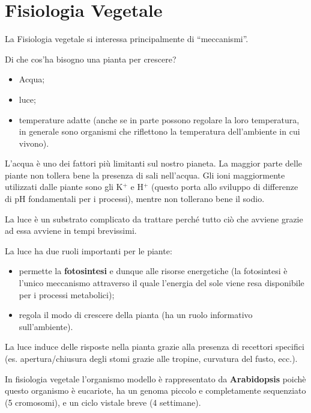 \documentclass[]{article}
\begin{document}
\section{Fisiologia Vegetale}\label{fisiologia-vegetale}

La Fisiologia vegetale si interessa principalmente di ``meccanismi''.

Di che cos'ha bisogno una pianta per crescere?

\begin{itemize}
\itemsep1pt\parskip0pt
\item
  Acqua;
\item
  luce;
\item
  temperature adatte (anche se in parte possono regolare la loro
  temperatura, in generale sono organismi che riflettono la temperatura
  dell'ambiente in cui vivono).
\end{itemize}

L'acqua è uno dei fattori più limitanti sul nostro pianeta. La maggior
parte delle piante non tollera bene la presenza di sali nell'acqua. Gli
ioni maggiormente utilizzati dalle piante sono gli K$^+$ e H$^+$ (questo
porta allo sviluppo di differenze di pH fondamentali per i processi),
mentre non tollerano bene il sodio.

La luce è un substrato complicato da trattare perché tutto ciò che
avviene grazie ad essa avviene in tempi brevissimi.

La luce ha due ruoli importanti per le piante:

\begin{itemize}
\itemsep1pt\parskip0pt
\item
  permette la \textbf{fotosintesi} e dunque alle risorse energetiche (la
  fotosintesi è l'unico meccanismo attraverso il quale l'energia del
  sole viene resa disponibile per i processi metabolici);
\item
  regola il modo di crescere della pianta (ha un ruolo informativo
  sull'ambiente).
\end{itemize}

La luce induce delle risposte nella pianta grazie alla presenza di
recettori specifici (es. apertura/chiusura degli stomi grazie alle
tropine, curvatura del fusto, ecc.).

In fisiologia vegetale l'organismo modello è rappresentato da
\textbf{Arabidopsis} poichè questo organismo è eucariote, ha un genoma
piccolo e completamente sequenziato (5 cromosomi), e un ciclo vistale
breve (4 settimane).
\end{document}
